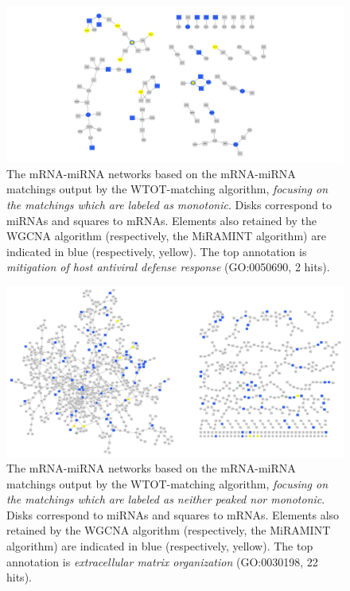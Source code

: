 \begin{figure}
  \centering
  \includegraphics[width=.9\textwidth]{images/networks_striatum_monot.png}
  \caption{The mRNA-miRNA networks based on the mRNA-miRNA matchings output by
    the WTOT-matching  algorithm, \textit{focusing on the  matchings which are
      labeled as monotonic}.  Disks correspond to miRNAs and squares to mRNAs.
    Elements also retained by the  WGCNA algorithm (respectively, the MiRAMINT
    algorithm)  are  indicated  in   blue  (respectively,  yellow).   The  top
    annotation  is  \textit{mitigation  of host  antiviral  defense  response}
    (GO:0050690, 2 hits).}
  \label{fig:network:monot}
\end{figure}
\begin{landscape}
  \begin{figure}
    \centering
    \includegraphics[height=.8\textwidth]{images/networks_striatum_nopeak_nomonot.png}
    \caption{The mRNA-miRNA networks based  on the mRNA-miRNA matchings output
      by the WTOT-matching algorithm,  \textit{focusing on the matchings which
        are labeled  as neither  peaked nor  monotonic}.  Disks  correspond to
      miRNAs  and squares  to  mRNAs.   Elements also  retained  by the  WGCNA
      algorithm (respectively,  the MiRAMINT algorithm) are  indicated in blue
      (respectively,  yellow).  The  top  annotation is  \textit{extracellular
        matrix organization} (GO:0030198, 22 hits).}
    \label{fig:network:others}
  \end{figure} 
\end{landscape}



